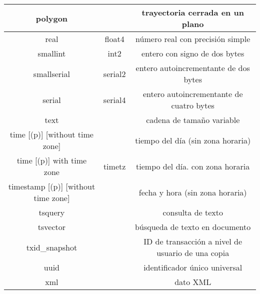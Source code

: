 \documentclass{article}
\begin{document}
\begin{center}
\begin{tabular}{ |c|c|c|  }
polygon && trayectoria cerrada en un plano\\
\hline
real & float4 & número real con precisión simple\\
\hline
smallint & int2 & entero con signo de dos bytes\\
\hline
smallserial & serial2 & entero autoincrementante de dos bytes\\
\hline
serial & serial4 & entero autoincrementante de cuatro bytes\\
\hline
text && cadena de tamaño variable\\
\hline
time [(p)] [without time zone] && tiempo del día (sin zona horaria)\\
\hline
time [(p)] with time zone & timetz & tiempo del día. con zona horaria\\
\hline
timestamp [(p)] [without time zone] && fecha y hora (sin zona horaria)\\
\hline
tsquery && consulta de texto\\
\hline
tsvector && búsqueda de texto en documento\\
\hline
txid\_snapshot && ID de transacción a nivel de usuario de una copia\\
\hline
uuid && identificador único universal\\
\hline
xml && dato XML\\
 \hline
\end{tabular}
\end{center}
\end{document}
